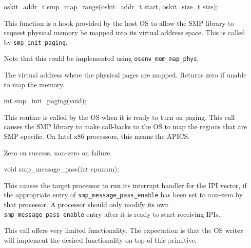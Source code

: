 \begin{apisyn}

        \funcproto oskit_addr_t smp_map_range(oskit_addr_t start,
		oskit_size_t size);
\end{apisyn}
\begin{apidesc}
	This function is a hook provided by the host OS to allow the SMP
	library to request physical memory be mapped into its virtual
	address space.
	This is called by {\tt smp_init_paging}.

	Note that this could be implemented using {\tt osenv_mem_map_phys}.
\end{apidesc}
\begin{apiret}
	The virtual address where the physical pages are mapped.
	Returns zero if unable to map the memory.
\end{apiret}


\begin{apisyn}

        \funcproto int smp_init_paging(void);
\end{apisyn}
\begin{apidesc}
	This routine is called by the OS when it is ready to turn on paging.
	This call causes the SMP library to make call-backs to the OS
	to map the regions that are SMP-specific.
	On Intel x86 processors, this means the APICS.
\end{apidesc}
\begin{apiret}
	Zero on success, non-zero on failure.
\end{apiret}


\begin{apisyn}

        \funcproto void smp_message_pass(int cpunum);
\end{apisyn}
\begin{apidesc}
	This causes the target processor to run its interrupt
	handler for the IPI vector, if the appropriate entry of
	{\tt smp_message_pass_enable} has been set to non-zero by
	that processor.  A processor should
	only modify its own {\tt smp_message_pass_enable} entry after
	it is ready to start receiving IPIs.

	This call offers very limited functionality.
	The expectation is that the OS writer will
	implement the desired functionality on top of this primitive.
\end{apidesc}


